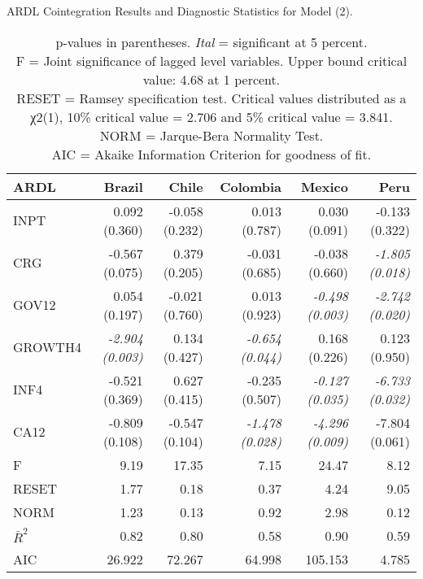 \documentclass[letterpaper]{article}
\begin{document}
\begin{table}[h]
    \begin{adjustwidth}{-.5in}{-.5in}  
\caption{ARDL Cointegration Results and Diagnostic Statistics for Model (2).}
        \begin{center}

\begin{tabular}{lrrrrr}
ARDL&Brazil&Chile&Colombia&Mexico&Peru\\
\hline
INPT&0.092 (0.360)&-0.058 (0.232)&0.013 (0.787)&0.030 (0.091)&-0.133 (0.322)\\
CRG&-0.567 (0.075)&0.379 (0.205)&-0.031 (0.685)&-0.038 (0.660)&\textit{-1.805 (0.018)}\\
GOV12&0.054 (0.197)&-0.021 (0.760)&0.013 (0.923)&\textit{-0.498 (0.003)}&\textit{-2.742 (0.020)}\\
GROWTH4&\textit{-2.904 (0.003)}&0.134 (0.427)&\textit{-0.654 (0.044)}&0.168 (0.226)&0.123 (0.950)\\
INF4&-0.521 (0.369)&0.627 (0.415)&-0.235 (0.507)&\textit{-0.127 (0.035)}&\textit{-6.733 (0.032)}\\
CA12&-0.809 (0.108)&-0.547 (0.104)&\textit{-1.478 (0.028)}&\textit{-4.296 (0.009)}&-7.804 (0.061)\\
\hline
F&9.19&17.35&7.15&24.47&8.12\\
RESET&1.77&0.18&0.37&4.24&9.05\\
NORM&1.23&0.13&0.92&2.98&0.12\\
$\bar{R}^2$&0.82&0.80&0.58&0.90&0.59\\
AIC&26.922&72.267&64.998&105.153&4.785\\
\hline
\end{tabular}
\end{center}
\caption*{p-values in parentheses. \textit{Ital} = significant at 5 percent.\\
F = Joint significance of lagged level variables. Upper bound critical value: 4.68 at 1 percent.\\
RESET = Ramsey specification test. Critical values distributed as a χ2(1), 10\% critical value = 2.706 and 5\% critical value = 3.841.\\
NORM = Jarque-Bera Normality Test. \\AIC = Akaike Information Criterion for goodness of fit. 
}
\end{adjustwidth}
\end{table}
\nocite{Hegerty2010}



\end{document}
